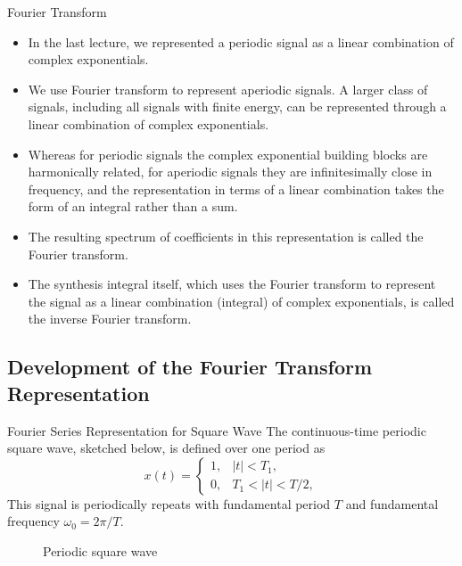 \begin{frame}{Fourier Transform}
    \begin{itemize}[<+->]
          \item In the last lecture, we represented a periodic signal as a linear combination of complex exponentials.
          \item We use Fourier transform to represent aperiodic signals. A larger class of signals, including all signals with finite energy, can be represented through a linear combination of complex exponentials.
          \item Whereas for periodic signals the complex exponential building blocks are harmonically related, for aperiodic signals they are \alert{infinitesimally close in frequency}, and the representation in terms of a linear combination takes the form of an integral rather than a sum.
          \item The resulting spectrum of coefficients in this representation is called the \alert{Fourier transform}.
          \item The synthesis integral itself, which uses the Fourier transform to represent the signal as a linear combination (integral) of complex exponentials, is called the \alert{inverse Fourier transform}.
      \end{itemize}
\end{frame}


\subsection{Development of the Fourier Transform Representation}

\begin{frame}[plain]{Fourier Series Representation for Square Wave}
        The continuous-time periodic square wave, sketched below, is defined over one period as
        \begin{equation*}
            x(t) = \begin{cases}
                1, & |t| <T_1,\\
                0, & T_1 < |t| < T/2,
            \end{cases}
        \end{equation*}
        This signal is periodically repeats with fundamental period $T$ and fundamental frequency $\omega_0 = 2\pi/T$.
    {
        \begin{figure}
          \centering
          
          \caption{Periodic square wave}\label{fi:example02_periodic_square_wave }
        \end{figure}
    }
\end{frame}



